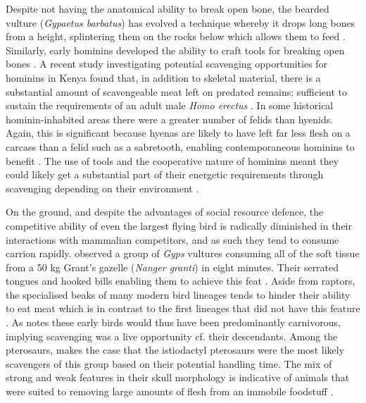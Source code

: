 \documentclass[a4paper,12pt]{article}
\begin{document}
Despite not having the anatomical ability to break open bone, the bearded vulture (\textit{Gypaetus barbatus}) has evolved a technique whereby it drops long bones from a height, splintering them on the rocks below which allows them to feed \citep{margalida2008bearded}. 
Similarly, early hominins developed the ability to craft tools for breaking open bones \citep{ARCM:ARCM12084}.
A recent study investigating potential scavenging opportunities for hominins in Kenya found that, in addition to skeletal material, there is a substantial amount of scavengeable meat left on predated remains; sufficient to sustain the requirements of an adult male \textit{Homo erectus} \citep{pobiner2015new}.
In some historical hominin-inhabited areas there were a greater number of felids than hyenids.
Again, this is significant because hyenas are likely to have left far less flesh on a carcass than a felid such as a sabretooth, enabling contemporaneous hominins to benefit \citep{pobiner2015new}.
The use of tools and the cooperative nature of hominins meant they could likely get a substantial part of their energetic requirements through scavenging depending on their environment \citep{moleon2014humans}.

On the ground, and despite the advantages of social resource defence, the competitive ability of even the largest flying bird is radically diminished in their interactions with mammalian competitors, and as such they tend to consume carrion rapidly. 
\cite{houston1974role} observed a group of \textit{Gyps} vultures consuming all of the soft tissue from a 50 kg Grant’s gazelle (\textit{Nanger granti}) in eight minutes. 
Their serrated tongues and hooked bills enabling them to achieve this feat \citep{houston1975digestive}. 
Aside from raptors, the specialised beaks of many modern bird lineages tends to hinder their ability to eat meat which is in contrast to the first lineages that did not have this feature \citep{martyniuk2012field}. 
As \cite{martyniuk2012field} notes these early birds would thus have been predominantly carnivorous, implying scavenging was a live opportunity cf. their descendants. 
Among the pterosaurs, \cite{witton2013pterosaurs} makes the case that the istiodactyl pterosaurs were the most likely scavengers of this group based on their potential handling time. 
The mix of strong and weak features in their skull morphology is indicative of animals that were suited to removing large amounts of flesh from an immobile foodstuff \citep{witton2013pterosaurs}. 
\end{document}
